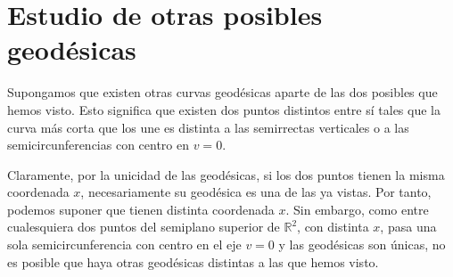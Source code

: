 \section{Estudio de otras posibles geodésicas}
Supongamos que existen otras curvas geodésicas aparte de las dos posibles que
hemos visto. Esto significa que existen dos puntos distintos entre sí tales que
la curva más corta que los une es distinta a las semirrectas verticales o  a las
semicircunferencias con centro en $v = 0$.

Claramente, por la unicidad de las geodésicas, si los dos puntos tienen la misma
coordenada $x$, necesariamente su geodésica es una de las ya vistas. Por tanto,
podemos suponer que tienen distinta coordenada $x$. Sin embargo, como entre
cualesquiera dos puntos del semiplano superior de $\mathbb{R}^2$, con distinta
$x$, pasa una sola semicircunferencia con centro en el eje $v = 0$ y las
geodésicas son únicas, no es posible que haya otras geodésicas distintas a las
que hemos visto.
